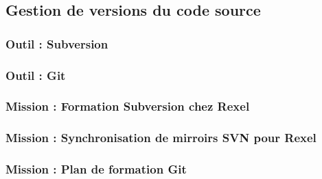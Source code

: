 \subsection{Gestion de versions du code source}

\subsubsection{Outil : Subversion}

\subsubsection{Outil : Git}

\subsubsection{Mission : Formation Subversion chez Rexel}

\subsubsection{Mission : Synchronisation de mirroirs SVN pour Rexel}

\subsubsection{Mission : Plan de formation Git}

